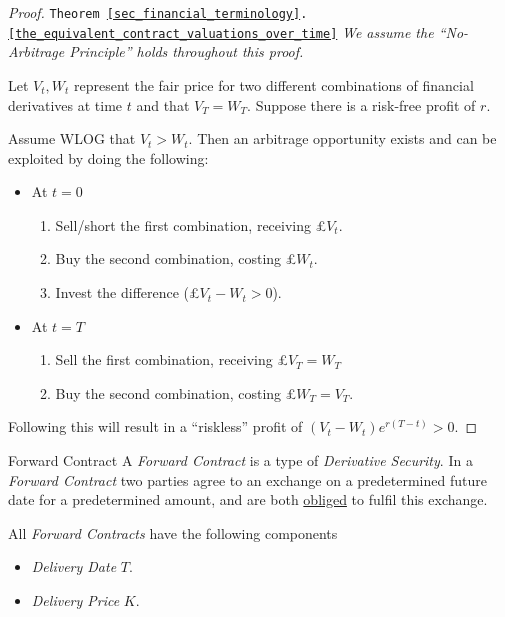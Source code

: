 \documentclass[11pt,a4paper]{article}
\begin{document}
  \begin{proof}{\texttt{Theorem \ref{sec_financial_terminology}.\ref{the_equivalent_contract_valuations_over_time}} }
    \textit{We assume the ``No-Arbitrage Principle'' holds throughout this proof.}
    \par Let $V_t,W_t$ represent the fair price for two different combinations of financial derivatives at time $t$ and that $V_T=W_T$. Suppose there is a risk-free profit of $r$.
    \par Assume WLOG that $V_t>W_t$. Then an arbitrage opportunity exists and can be exploited by doing the following:
    \begin{itemize}
      \item At $t=0$
      \begin{enumerate}
        \item Sell/short the first combination, receiving £$V_t$.
        \item Buy the second combination, costing £$W_t$.
        \item Invest the difference (£$V_t-W_t>0$).
      \end{enumerate}
      \item At $t=T$
      \begin{enumerate}
        \item Sell the first combination, receiving £$V_T=W_T$
        \item Buy the second combination, costing £$W_T=V_T$.
      \end{enumerate}
    \end{itemize}
    Following this will result in a ``riskless'' profit of $(V_t-W_t)e^{r(T-t)}>0$.
  \end{proof}

  \begin{definition}{Forward Contract}
    A \textit{Forward Contract} is a type of \textit{Derivative Security}. In a \textit{Forward Contract} two parties agree to an exchange on a predetermined future date for a predetermined amount, and are both \underline{obliged} to fulfil this exchange.
    \par All \textit{Forward Contracts} have the following components
    \begin{itemize}
      \item \textit{Delivery Date} $T$.
      \item \textit{Delivery Price} $K$.
    \end{itemize}
  \end{definition}
\end{document}
